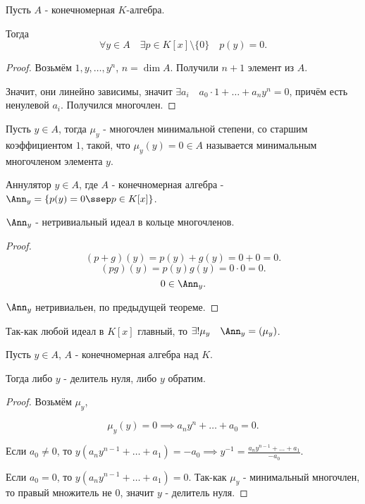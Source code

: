 \begin{lemma} \thmslashn

    Пусть $A$ - конечномерная $K$-алгебра.

    Тогда
    \[ \forall{y\in A}\quad \exists{p\in K[x] \setminus \{0\} }\quad p(y) = 0 .\]
    \begin{proof} \thmslashn
    
        Возьмём $1, y, \ldots, y^{n}$, $n = \dim A$. Получили $n+1$ элемент из $A$. 

        Значит, они линейно зависимы, значит $\exists{a_{i}}\quad a_0 \cdot 1 + \ldots + a_{n} y^{n} = 0$, причём есть ненулевой $a_{i}$. Получился многочлен.
    \end{proof}
\end{lemma}
\begin{definition} \thmslashn 

    Пусть $y\in A$, тогда $\mu_{y}$ - многочлен минимальной степени, со старшим коэффициентом $1$, такой, что $\mu_{y}(y) = 0\in A$ называется минимальным многочленом элемента $y$.
\end{definition}
\begin{definition} \thmslashn 

    Аннулятор $y\in A$, где $A$ - конечномерная алгебра - $\Ann_{y} = \{p(y) = 0 \ssep p\in K[x]\} $.
\end{definition}
\begin{property} \thmslashn

    $\Ann_{y}$ - нетривиальный идеал в кольце многочленов.
    \begin{proof} \thmslashn
    
        \[ (p+g)(y) = p(y)+g(y) = 0 + 0 = 0 .\]
        \[ (pg)(y) = p(y)g(y) = 0 \cdot 0 = 0 .\]
        \[ 0\in \Ann_{y} .\]

        $\Ann_{y}$ нетривиальен, по предыдущей теореме.
    \end{proof}
\end{property}
\begin{consequence} \thmslashn

    Так-как любой идеал в $K[x]$ главный, то $\exists!{\mu_{y}}\quad \Ann_{y} = (\mu_{y})$.
\end{consequence}
\begin{lemma} \thmslashn

    Пусть $y\in A$, $A$ - конечномерная алгебра над $K$.

    Тогда либо $y$ - делитель нуля, либо $y$ обратим.

    \begin{proof} \thmslashn
    
        Возьмём $\mu_{y}$,

        \[ \mu_{y}(y) = 0 \implies a_{n}y^{n} + \ldots + a_0 = 0 .\]

        Если $a_0 \neq 0$, то $y(a_{n}y^{n-1} + \ldots + a_1) = -a_0 \implies y^{-1} = \frac{a_{n}y^{n-1} + \ldots + a_1}{-a_0}$.

        Если $a_0 = 0$, то $y(a_ny^{n-1} + \ldots + a_1) = 0$. Так-как $\mu_{y}$ - минимальный многочлен, то правый множитель не $0$, значит $y$ - делитель нуля.
    \end{proof}
\end{lemma}
